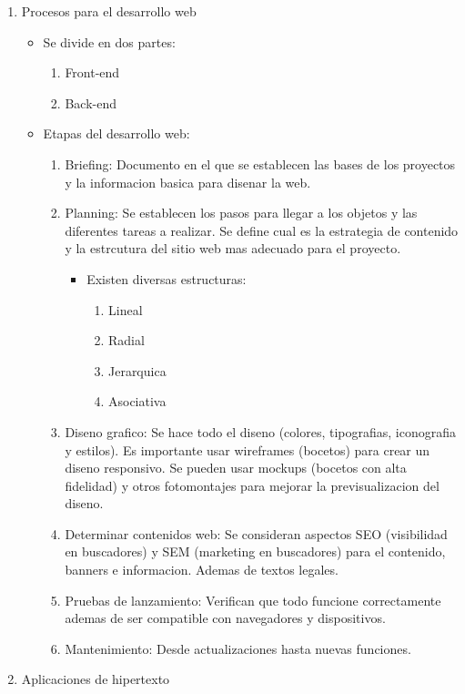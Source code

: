 \documentclass[11pt]{article}
\begin{document}
\begin{enumerate}
\item Procesos para el desarrollo web
\label{sec:org3c64c1f}
\begin{itemize}
\item Se divide en dos partes:
\begin{enumerate}
\item Front-end
\item Back-end
\end{enumerate}

\item Etapas del desarrollo web:
\begin{enumerate}
\item Briefing: Documento en el que se establecen las bases de los proyectos y la informacion basica para disenar la web.
\item Planning: Se establecen los pasos para llegar a los objetos y las diferentes tareas a realizar. Se define cual es la estrategia de contenido y la estrcutura del sitio web mas adecuado para el proyecto.
\begin{itemize}
\item Existen diversas estructuras:
\begin{enumerate}
\item Lineal
\item Radial
\item Jerarquica
\item Asociativa
\end{enumerate}
\end{itemize}
\item Diseno grafico: Se hace todo el diseno (colores, tipografias, iconografia y estilos). Es importante usar wireframes (bocetos) para crear un diseno responsivo. Se pueden usar mockups (bocetos con alta fidelidad) y otros fotomontajes para mejorar la previsualizacion del diseno.
\item Determinar contenidos web: Se consideran aspectos SEO (visibilidad en buscadores) y SEM (marketing en buscadores) para el contenido, banners e informacion. Ademas de textos legales.
\item Pruebas de lanzamiento: Verifican que todo funcione correctamente ademas de ser compatible con navegadores y dispositivos.
\item Mantenimiento: Desde actualizaciones hasta nuevas funciones.
\end{enumerate}
\end{itemize}
\item Aplicaciones de hipertexto

\end{enumerate}
\end{document}
